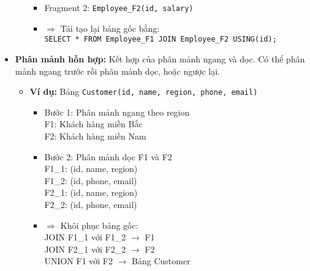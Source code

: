 \documentclass[14pt]{extarticle}
\begin{document}
\begin{itemize}
\begin{itemize}
\begin{itemize}
            \item Fragment 2: \texttt{Employee\_F2(id, salary)}
            \item $\Rightarrow$ Tái tạo lại bảng gốc bằng:\\
            \texttt{SELECT * FROM Employee\_F1 JOIN Employee\_F2 USING(id);}
        \end{itemize}
    \end{itemize}
    \item \textbf{Phân mảnh hỗn hợp:} Kết hợp của phân mảnh ngang và dọc. Có thể phân mảnh ngang trước rồi phân mảnh dọc, hoặc ngược lại.
    \begin{itemize}
        \item \textbf{Ví dụ:} Bảng \texttt{Customer(id, name, region, phone, email)}
        \begin{itemize}
            \item Bước 1: Phân mảnh ngang theo region\\
            F1: Khách hàng miền Bắc\\
            F2: Khách hàng miền Nam
            \item Bước 2: Phân mảnh dọc F1 và F2\\
            F1\_1: (id, name, region)\\
            F1\_2: (id, phone, email)\\
            F2\_1: (id, name, region)\\
            F2\_2: (id, phone, email)
            \item $\Rightarrow$ Khôi phục bảng gốc:\\
            JOIN F1\_1 với F1\_2 $\rightarrow$ F1\\
            JOIN F2\_1 với F2\_2 $\rightarrow$ F2\\
            UNION F1 với F2 $\rightarrow$ Bảng Customer
        \end{itemize}
    \end{itemize}
\end{itemize}
\end{document}
